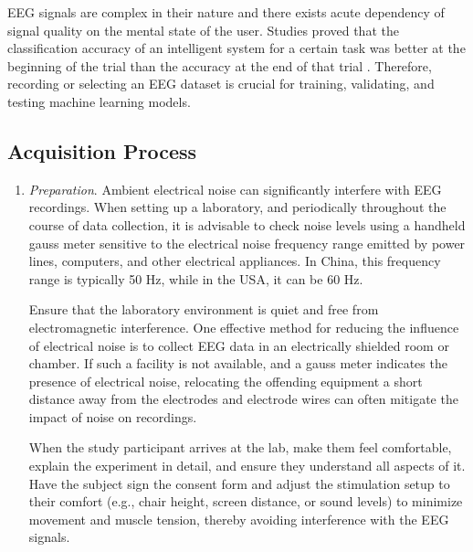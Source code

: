 \documentclass[journal,twocolumn]{IEEEtran}
\begin{document}
EEG signals are complex in their nature and there exists acute dependency of signal quality on the mental state of the user. Studies proved that the classification accuracy of an intelligent system for a certain task was better at the beginning of the trial than the accuracy at the end of that trial \cite{padfield2019eeg}. Therefore, recording or selecting an EEG dataset is crucial for training, validating, and testing machine learning models.

\subsection{Acquisition Process} \cite{light2010electroencephalography}

\begin{enumerate}
\item \emph{Preparation}.
Ambient electrical noise can significantly interfere with EEG recordings. When setting up a laboratory, and periodically throughout the course of data collection, it is advisable to check noise levels using a handheld gauss meter sensitive to the electrical noise frequency range emitted by power lines, computers, and other electrical appliances. In China, this frequency range is typically 50 Hz, while in the USA, it can be 60 Hz.

Ensure that the laboratory environment is quiet and free from electromagnetic interference. One effective method for reducing the influence of electrical noise is to collect EEG data in an electrically shielded room or chamber. If such a facility is not available, and a gauss meter indicates the presence of electrical noise, relocating the offending equipment a short distance away from the electrodes and electrode wires can often mitigate the impact of noise on recordings.

When the study participant arrives at the lab, make them feel comfortable, explain the experiment in detail, and ensure they understand all aspects of it. Have the subject sign the consent form and adjust the stimulation setup to their comfort (e.g., chair height, screen distance, or sound levels) to minimize movement and muscle tension, thereby avoiding interference with the EEG signals.


\end{enumerate}
\end{document}
